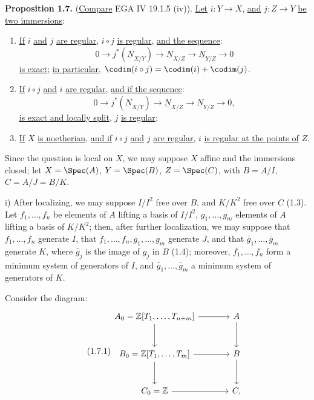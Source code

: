 %
\textbf{Proposition 1.7.} (\uline{Compare} EGA IV 19.1.5 (iv)). \uline{Let} $i:Y\longrightarrow X$, \uline{and} $j:Z\longrightarrow Y$ \uline{be two immersions}:
\begin{enumerate}[label=\roman*)]
\item \uline{If} $i$ \uline{and} $j$ \uline{are regular}, $i\circ j$ \uline{is regular}, \uline{and the sequence}:
\[
0\longrightarrow j^*(\underline{N}_{X/Y})\longrightarrow \underline{N}_{X/Z}\longrightarrow \underline{N}_{Y/Z}\longrightarrow0
\]
\uline{is exact}; \uline{in particular}, $\codim(i\circ j)=\codim(i)+\codim(j)$.
\item \uline{If} $i\circ j$ \uline{and} $i$ \uline{are regular}, \uline{and if the sequence}:
\[
0\longrightarrow j^*(\underline{N}_{X/Y})\longrightarrow \underline{N}_{X/Z}\longrightarrow \underline{N}_{Y/Z}\longrightarrow0,
\]
\uline{is exact and locally split}, $j$ \uline{is regular};
\item \uline{If} $X$ \uline{is noetherian}, \uline{and if} $i\circ j$ \uline{and} $j$ \uline{are regular}, $i$ \uline{is regular at the points of} $Z$.
\end{enumerate}

Since the question is local on $X$, we may suppose $X$ affine and the immersions closed; let $X=\Spec(A)$, $Y=\Spec(B)$, $Z=\Spec(C)$, with $B=A/I$, $C=A/J=B/K$.

i) After localizing, we may suppose $I/I^2$ free over $B$, and $K/K^2$ free over $C$ (1.3). Let $f_1,\ldots,f_n$ be elements of $A$ lifting a basis of $I/I^2$, $g_1,\ldots,g_m$ elements of $A$ lifting a basis of $K/K^2$; then, after further localization, we may suppose that $f_1,\ldots,f_n$ generate $I$, that $f_1,\ldots,f_n,g_1,\ldots,g_m$ generate $J$, and that $\bar g_1,\ldots,\bar g_m$ generate $K$, where $\bar g_j$ is the image of $g_j$ in $B$ (1.4); moreover, $f_1,\ldots,f_n$ form a minimum system of generators of $I$, and $\bar g_1,\ldots,\bar g_m$ a minimum system of generators of $K$.

Consider the diagram:
\begin{equation}\tag{1.7.1}
\begin{tikzcd}[column sep=large,row sep=large]
A_0=\mathbb Z[T_1,\ldots,T_{n+m}] \arrow[r] \arrow[d] & A \arrow[d]\\
B_0=\mathbb Z[T_1,\ldots,T_m] \arrow[r] \arrow[d] & B \arrow[d]\\
C_0=\mathbb Z \arrow[r] & C,
\end{tikzcd}
\end{equation}

